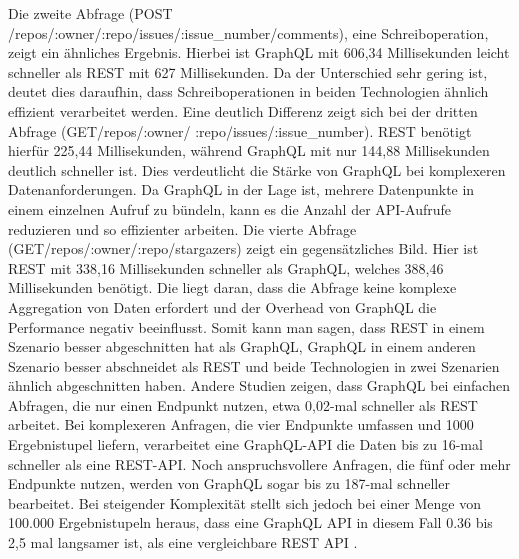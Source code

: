Die zweite Abfrage (POST /repos/:owner/:repo/issues/:issue\_number/comments), eine Schreiboperation, zeigt ein ähnliches Ergebnis. Hierbei ist GraphQL mit 606,34 Millisekunden leicht schneller als REST mit 627 Millisekunden. Da der Unterschied sehr gering ist, deutet dies daraufhin, dass Schreiboperationen in beiden Technologien ähnlich effizient verarbeitet werden.
Eine deutlich Differenz zeigt sich bei der dritten Abfrage (GET/repos/:owner/ :repo/issues/:issue\_number). REST benötigt hierfür 225,44 Millisekunden, während GraphQL mit nur 144,88 Millisekunden deutlich schneller ist. Dies verdeutlicht die Stärke von GraphQL bei komplexeren Datenanforderungen. Da GraphQL in der Lage ist, mehrere Datenpunkte in einem einzelnen Aufruf zu bündeln, kann es die Anzahl der API-Aufrufe reduzieren und so effizienter arbeiten.
Die vierte Abfrage (GET/repos/:owner/:repo/stargazers) zeigt ein gegensätzliches Bild. Hier ist REST mit 338,16 Millisekunden schneller als GraphQL, welches 388,46 Millisekunden benötigt. Die liegt daran, dass die Abfrage keine komplexe Aggregation von Daten erfordert und der Overhead von GraphQL die Performance negativ beeinflusst.
Somit kann man sagen, dass REST in einem Szenario besser abgeschnitten hat als GraphQL, GraphQL in einem anderen Szenario besser abschneidet als REST und beide Technologien in zwei Szenarien ähnlich abgeschnitten haben. 
\citep{graphqlreplacerest}
\newline
Andere Studien zeigen, dass GraphQL bei einfachen Abfragen, die nur einen Endpunkt nutzen, etwa 0,02-mal schneller als REST arbeitet. \citep{migrategraphql}
\newline
Bei komplexeren Anfragen, die vier Endpunkte umfassen und 1000 Ergebnistupel liefern, verarbeitet eine GraphQL-API die Daten bis zu 16-mal schneller als eine REST-API.\citep{analysegraphql}
\newline
Noch anspruchsvollere Anfragen, die fünf oder mehr Endpunkte nutzen, werden von GraphQL sogar bis zu 187-mal schneller bearbeitet.\citep{analysewebgraphql}
\newline
Bei steigender Komplexität stellt sich jedoch bei einer Menge von 100.000 Ergebnistupeln heraus, dass eine GraphQL API in diesem Fall 0.36 \citep{analysegraphql} bis 2,5 mal langsamer ist, als eine vergleichbare REST API \citep{restvsgraphql}.
